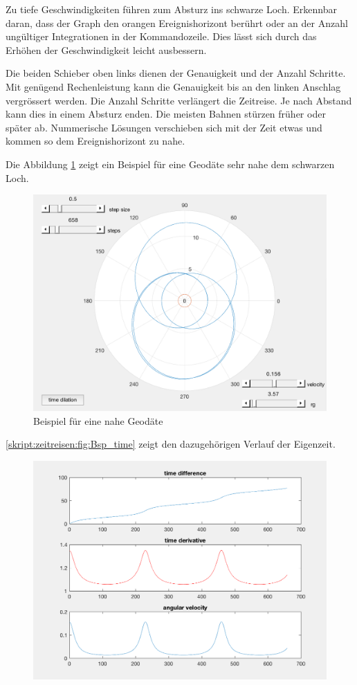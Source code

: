 \begin{refsection}
    Zu tiefe Geschwindigkeiten führen zum Absturz ins schwarze Loch. Erkennbar daran, dass der Graph den orangen Ereignishorizont berührt oder an der Anzahl ungültiger Integrationen in der Kommandozeile. Dies lässt sich durch das Erhöhen der Geschwindigkeit leicht ausbessern.
    
    Die beiden Schieber oben links dienen der Genauigkeit und der Anzahl Schritte. Mit genügend Rechenleistung kann die Genauigkeit bis an den linken Anschlag vergrössert werden. Die Anzahl Schritte verlängert die Zeitreise. Je nach Abstand kann dies in einem Absturz enden. Die meisten Bahnen stürzen früher oder später ab. Nummerische Lösungen verschieben sich mit der Zeit etwas und kommen so dem Ereignishorizont zu nahe.
    
    Die Abbildung \ref{skript:zeitreisen:fig:Bsp} zeigt ein Beispiel für eine Geodäte sehr nahe dem schwarzen Loch.
      \begin{figure}
        \centering
        \includegraphics[width=12cm]{zeitreisen/Bsp.png}
        \caption{Beispiel für eine nahe Geodäte}
        \label{skript:zeitreisen:fig:Bsp} 
    \end{figure}
    \ref{skript:zeitreisen:fig:Bsp_time} zeigt den dazugehörigen Verlauf der Eigenzeit.
      \begin{figure}
        \centering
        \includegraphics[width=12cm]{zeitreisen/Bsp_time.png}

\end{figure}
\end{refsection}
